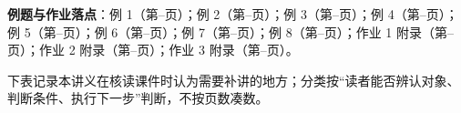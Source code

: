 \documentclass[11pt]{ctexart}
\let\basesubhdr\subhdr
\renewcommand{\subhdr}[1]{\needspace{8\baselineskip}\basesubhdr{#1}}
\begin{document}
\textbf{例题与作业落点}：例 1（第\pageref{ex:1:start}--\pageref{ex:1:end}页）；例 2（第\pageref{ex:2:start}--\pageref{ex:2:end}页）；例 3（第\pageref{ex:3:start}--\pageref{ex:3:end}页）；例 4（第\pageref{ex:4:start}--\pageref{ex:4:end}页）；例 5（第\pageref{ex:5:start}--\pageref{ex:5:end}页）；例 6（第\pageref{ex:6:start}--\pageref{ex:6:end}页）；例 7（第\pageref{ex:7:start}--\pageref{ex:7:end}页）；例 8（第\pageref{ex:8:start}--\pageref{ex:8:end}页）；作业 1 附录（第\pageref{ans:P1}--\pageref{ans:P1:end}页）；作业 2 附录（第\pageref{ans:P2}--\pageref{ans:P2:end}页）；作业 3 附录（第\pageref{ans:P3}--\pageref{ans:P3:end}页）。

\clearpage
{}

下表记录本讲义在核读课件时认为需要补讲的地方；分类按“读者能否辨认对象、判断条件、执行下一步”判断，不按页数凑数。
\end{document}
